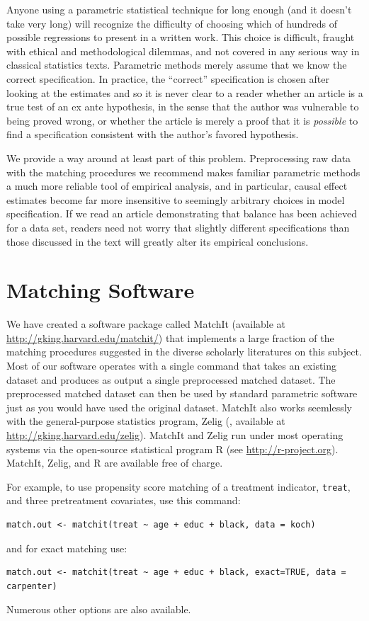\documentclass[11pt,titlepage]{article}
\begin{document}
Anyone using a parametric statistical technique for long enough (and
it doesn't take very long) will recognize the difficulty of choosing
which of hundreds of possible regressions to present in a written
work.  This choice is difficult, fraught with ethical and
methodological dilemmas, and not covered in any serious way in
classical statistics texts.  Parametric methods merely assume that we
know the correct specification.  In practice, the ``correct''
specification is chosen after looking at the estimates and so it is
never clear to a reader whether an article is a true test of an ex
ante hypothesis, in the sense that the author was vulnerable to being
proved wrong, or whether the article is merely a proof that it is
\emph{possible} to find a specification consistent with the author's
favored hypothesis.

We provide a way around at least part of this problem.  Preprocessing
raw data with the matching procedures we recommend makes familiar
parametric methods a much more reliable tool of empirical analysis,
and in particular, causal effect estimates become far more insensitive
to seemingly arbitrary choices in model specification.  If we read an
article demonstrating that balance has been achieved for a data set,
readers need not worry that slightly different specifications than
those discussed in the text will greatly alter its empirical
conclusions.

\appendix
\section{Matching Software}\label{s:matchit}

We have created a software package called MatchIt (available at
\url{http://gking.harvard.edu/matchit/}) that implements a large
fraction of the matching procedures suggested in the diverse scholarly
literatures on this subject.  Most of our software operates with a
single command that takes an existing dataset and produces as output a
single preprocessed matched dataset.  The preprocessed matched dataset
can then be used by standard parametric software just as you would
have used the original dataset.  MatchIt also works seemlessly with
the general-purpose statistics program, Zelig (\citet{ImaKinLau04},
available at \url{http://gking.harvard.edu/zelig}).  MatchIt and Zelig
run under most operating systems via the open-source statistical
program R (see \url{http://r-project.org}).  MatchIt, Zelig, and R are
available free of charge.

For example, to use propensity score matching of a treatment
indicator, \texttt{treat}, and three pretreatment covariates, use this
command:
\begin{verbatim}
match.out <- matchit(treat ~ age + educ + black, data = koch)
\end{verbatim}
and for exact matching use:
\begin{verbatim}
match.out <- matchit(treat ~ age + educ + black, exact=TRUE, data = carpenter)
\end{verbatim}
Numerous other options are also available.
\end{document}
